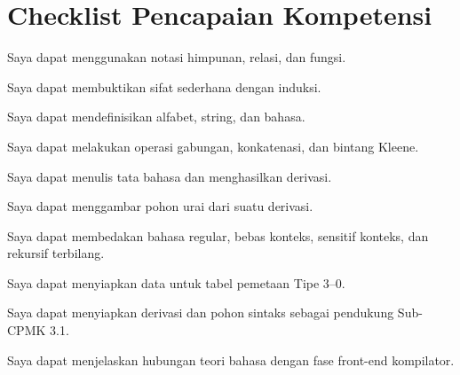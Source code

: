 \section*{Checklist Pencapaian Kompetensi}

\begin{checklist}
  \item Saya dapat menggunakan notasi himpunan, relasi, dan fungsi.
  \item Saya dapat membuktikan sifat sederhana dengan induksi.
  \item Saya dapat mendefinisikan alfabet, string, dan bahasa.
  \item Saya dapat melakukan operasi gabungan, konkatenasi, dan
        bintang Kleene.
  \item Saya dapat menulis tata bahasa dan menghasilkan derivasi.
  \item Saya dapat menggambar pohon urai dari suatu derivasi.
  \item Saya dapat membedakan bahasa regular, bebas konteks, sensitif
        konteks, dan rekursif terbilang.
  \item Saya dapat menyiapkan data untuk tabel pemetaan Tipe 3--0.
  \item Saya dapat menyiapkan derivasi dan pohon sintaks sebagai
        pendukung Sub-CPMK 3.1.
  \item Saya dapat menjelaskan hubungan teori bahasa dengan fase
        front-end kompilator.
\end{checklist}
